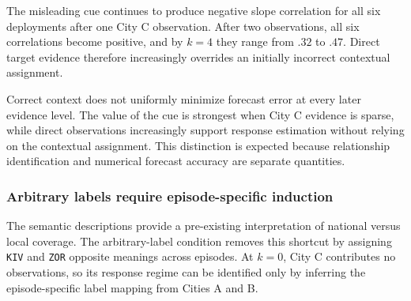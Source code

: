 The misleading cue continues to produce negative slope correlation for all six deployments after one City C observation.
After two observations, all six correlations become positive, and by \(k=4\) they range from \(.32\) to \(.47\).
Direct target evidence therefore increasingly overrides an initially incorrect contextual assignment.

Correct context does not uniformly minimize forecast error at every later evidence level.
The value of the cue is strongest when City C evidence is sparse, while direct observations increasingly support response estimation without relying on the contextual assignment.
This distinction is expected because relationship identification and numerical forecast accuracy are separate quantities.

\subsubsection{Arbitrary labels require episode-specific induction}
\label{app:coin-city-symbol-context}

The semantic descriptions provide a pre-existing interpretation of national versus local coverage.
The arbitrary-label condition removes this shortcut by assigning \texttt{KIV} and \texttt{ZOR} opposite meanings across episodes.
At \(k=0\), City C contributes no observations, so its response regime can be identified only by inferring the episode-specific label mapping from Cities A and B.


